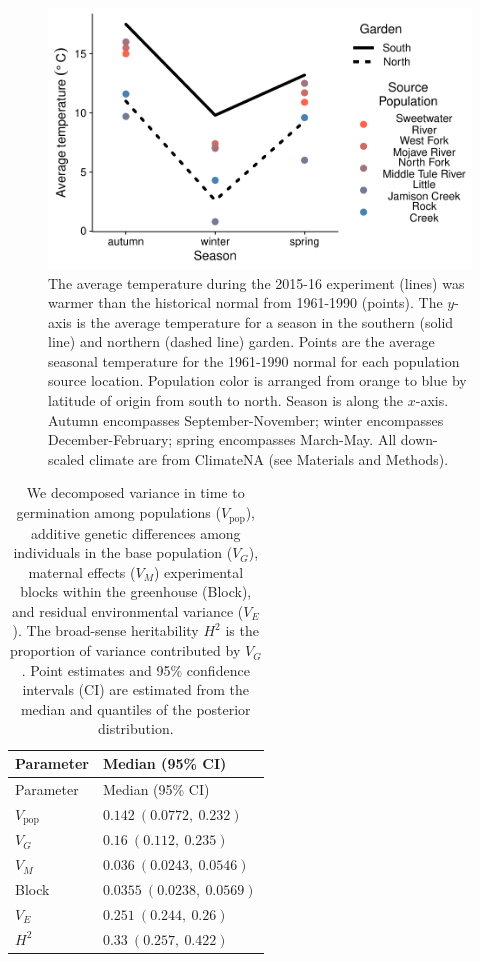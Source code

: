 \documentclass[
  12pt,
]{article}
\begin{document}
\begin{figure}[ht]
  \includegraphics[width=\textwidth]{figures/climate.pdf}
  \caption{The average temperature during the 2015-16 experiment (lines) was warmer than the historical normal from 1961-1990 (points). The $y$-axis is the average temperature for a season in the southern (solid line) and northern (dashed line) garden. Points are the average seasonal temperature for the 1961-1990 normal for each population source location. Population color is arranged from orange to blue by latitude of origin from south to north. Season is along the $x$-axis. Autumn encompasses September-November; winter encompasses December-February; spring encompasses March-May. All down-scaled climate are from ClimateNA (see Materials and Methods).}
  \label{fig:climate}
\end{figure}

\clearpage

\begin{longtable}[]{@{}ll@{}}
\caption{\label{tab:vc_table_germ} We decomposed variance in time to germination among populations (\(V_\text{pop}\)), additive genetic differences among individuals in the base population (\(V_G\)), maternal effects (\(V_M\)) experimental blocks within the greenhouse (Block), and residual environmental variance (\(V_E\)). The broad-sense heritability \(H^2\) is the proportion of variance contributed by \(V_G\). Point estimates and 95\% confidence intervals (CI) are estimated from the median and quantiles of the posterior distribution.}\tabularnewline
\toprule
Parameter & Median (95\% CI) \\
\midrule
\endfirsthead
\toprule
Parameter & Median (95\% CI) \\
\midrule
\endhead
\(V_\text{pop}\) & \(0.142~(0.0772,~0.232)\) \\
\(V_G\) & \(0.16~(0.112,~0.235)\) \\
\(V_M\) & \(0.036~(0.0243,~0.0546)\) \\
Block & \(0.0355~(0.0238,~0.0569)\) \\
\(V_E\) & \(0.251~(0.244,~0.26)\) \\
\(H^2\) & \(0.33~(0.257,~0.422)\) \\
\bottomrule
\end{longtable}
\end{document}
